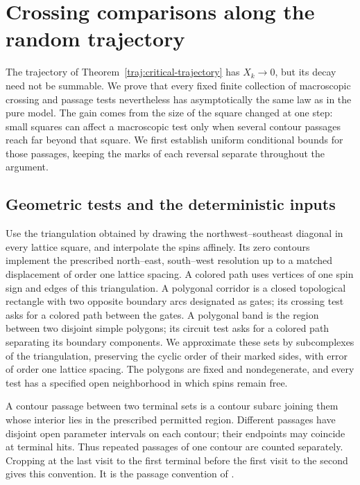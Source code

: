 \section{Crossing comparisons along the random trajectory}
\label{sec:crossings}

The trajectory of Theorem~\ref{traj:critical-trajectory} has
$X_k\to0$, but its decay need not be summable.  We prove that every fixed
finite collection of macroscopic crossing and passage tests nevertheless
has asymptotically the same law as in the pure model.  The gain comes
from the size of the square
changed at one step: small squares can affect a macroscopic test only
when several contour passages reach far beyond that square.  We first
establish uniform conditional bounds for those passages, keeping the
marks of each reversal separate throughout the argument.

\subsection{Geometric tests and the deterministic inputs}

Use the triangulation obtained by drawing the northwest--southeast
diagonal in every lattice square, and interpolate the spins affinely.
Its zero contours implement the prescribed north--east,
south--west resolution up to a matched displacement of order one lattice
spacing.  A colored path uses vertices of one spin sign and edges of this
triangulation.  A polygonal corridor is a closed topological rectangle
with two opposite boundary arcs designated as gates; its crossing test
asks for a colored path between the gates.  A polygonal band is the
region between two disjoint simple polygons; its circuit test asks for a
colored path separating its boundary components.  We approximate these
sets by subcomplexes of the triangulation, preserving the cyclic order
of their marked sides, with error of order one lattice spacing.  The
polygons are fixed and nondegenerate, and every test has a specified open
neighborhood in which spins remain free.

A contour passage between two terminal sets is a contour subarc joining
them whose interior lies in the prescribed permitted region.  Different
passages have disjoint open parameter intervals on each contour; their
endpoints may coincide at terminal hits.  Thus repeated passages of one
contour are counted separately.  Cropping at the last visit to the first
terminal before the first visit to the second gives this convention.
It is the passage convention of \cite[Section~5, ``Tests, passages, and
independent marks'']{S}.

